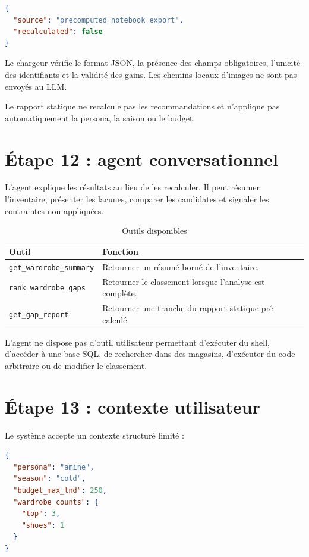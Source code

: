 \documentclass[11pt,a4paper]{article}
\begin{document}
\begin{lstlisting}[language=json]
{
  "source": "precomputed_notebook_export",
  "recalculated": false
}
\end{lstlisting}

Le chargeur vérifie le format JSON, la présence des champs obligatoires,
l'unicité des identifiants et la validité des gains. Les chemins locaux
d'images ne sont pas envoyés au LLM.

Le rapport statique ne recalcule pas les recommandations et n'applique pas
automatiquement la persona, la saison ou le budget.

\section{Étape 12 : agent conversationnel}

L'agent explique les résultats au lieu de les recalculer. Il peut résumer
l'inventaire, présenter les lacunes, comparer les candidates et signaler les
contraintes non appliquées.

\begin{table}[H]
\centering
\caption{Outils disponibles}
\begin{tabularx}{\textwidth}{>{\ttfamily\raggedright\arraybackslash}p{4cm} X}
\toprule
\textbf{Outil} & \textbf{Fonction} \\
\midrule
\texttt{get\_wardrobe\_summary} &
Retourner un résumé borné de l'inventaire. \\
\texttt{rank\_wardrobe\_gaps} &
Retourner le classement lorsque l'analyse est complète. \\
\texttt{get\_gap\_report} &
Retourner une tranche du rapport statique pré-calculé. \\
\bottomrule
\end{tabularx}
\end{table}

L'agent ne dispose pas d'outil utilisateur permettant d'exécuter du shell,
d'accéder à une base SQL, de rechercher dans des magasins, d'exécuter du code
arbitraire ou de modifier le classement.

\section{Étape 13 : contexte utilisateur}

Le système accepte un contexte structuré limité :

\begin{lstlisting}[language=json]
{
  "persona": "amine",
  "season": "cold",
  "budget_max_tnd": 250,
  "wardrobe_counts": {
    "top": 3,
    "shoes": 1
  }
}
\end{lstlisting}
\end{document}
